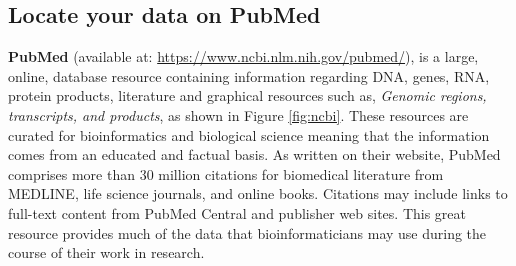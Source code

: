 
\vspace*{-.1in}
\subsection*{Locate your data on PubMed}
\vspace*{-.1in} 

\textbf{PubMed} (available at: \url{https://www.ncbi.nlm.nih.gov/pubmed/}), is a large, online, database resource containing information regarding DNA, genes, RNA, protein products, literature and graphical resources such as, \emph{Genomic regions, transcripts, and products}, as shown in Figure \ref{fig:ncbi}. These resources are curated for bioinformatics and biological science meaning that the information comes from an educated and factual basis. As written on their website, PubMed comprises more than 30 million citations for biomedical literature from MEDLINE, life science journals, and online books. Citations may include links to full-text content from PubMed Central and publisher web sites. This great resource provides much of the data that bioinformaticians may use during the course of their work in research.


